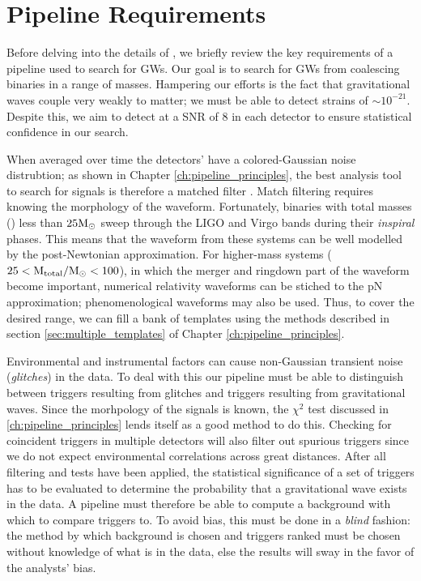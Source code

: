 \section{Pipeline Requirements}
\label{sec:PipelineRequirements}

Before delving into the details of \ihope, we briefly review the key
requirements of a pipeline used to search for \ac{GW}s. Our goal is to search
for \ac{GW}s from coalescing binaries in a range of masses. Hampering our
efforts is the fact that gravitational waves couple very weakly to matter; we
must be able to detect strains of $\sim10^{-21}$. Despite this, we
aim to detect at a \ac{SNR} of $8$ in each detector to ensure statistical
confidence in our search.

When averaged over time the detectors' have a colored-Gaussian noise
distrubtion; as shown in Chapter \ref{ch:pipeline_principles}, the best analysis tool to search for signals is therefore a
matched filter \cite{?}. Match filtering requires knowing the morphology of the
waveform. Fortunately, binaries with total masses (\mtotal) less than $25\mathrm{M_\odot}$
sweep through the \ac{LIGO} and Virgo bands during their {\it inspiral} phases.
This means that the waveform from these systems can be well modelled by the
post-Newtonian approximation. For higher-mass systems ($25 < \mathrm{M_{total}}/\mathrm{M_\odot} <
100$), in which the merger and ringdown part of the waveform become important,
numerical relativity waveforms can be stiched to the \ac{pN} approximation;
phenomenological waveforms may also be used. Thus, to cover the desired range,
we can fill a bank of templates using the methods described in section \ref{sec:multiple_templates} of Chapter \ref{ch:pipeline_principles}.

Environmental and instrumental factors can cause non-Gaussian transient noise
(\emph{glitches}) in the data. To deal with this our pipeline must be able to
distinguish between triggers resulting from glitches and triggers resulting
from gravitational waves. Since the morhpology of the signals is known, the $\chi^2$ test discussed in \ref{ch:pipeline_principles} lends itself as a good method to do this. Checking for coincident triggers in multiple detectors will
also filter out spurious triggers since we do not expect environmental
correlations across great distances. After all filtering and tests have been
applied, the statistical significance of a set of triggers has to be evaluated
to determine the probability that a gravitational wave exists in the data. A
pipeline must therefore be able to compute a background with which to compare
triggers to. To avoid bias, this must be done in a {\it blind} fashion: the
method by which background is chosen and triggers ranked must be chosen without
knowledge of what is in the data, else the results will sway in the favor of the
analysts' bias. 


